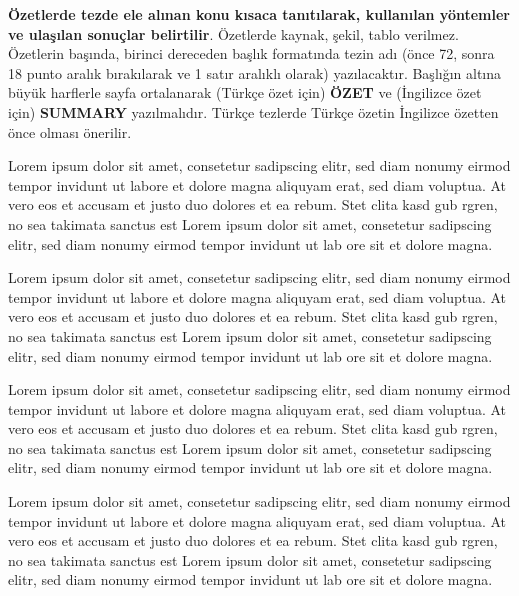 \begin{ozet}
\textbf{Özetlerde tezde ele alınan konu kısaca tanıtılarak, kullanılan yöntemler ve ulaşılan sonuçlar belirtilir}. Özetlerde kaynak, şekil, tablo verilmez. Özetlerin başında, birinci dereceden başlık formatında tezin adı (önce 72, sonra 18 punto aralık bırakılarak ve 1 satır aralıklı olarak) yazılacaktır.  Başlığın altına büyük harflerle sayfa ortalanarak (Türkçe özet için) \textbf{ÖZET} ve (İngilizce özet için) \textbf{SUMMARY} yazılmalıdır. Türkçe tezlerde Türkçe özetin İngilizce özetten önce olması önerilir.

Lorem ipsum dolor sit amet, consetetur sadipscing elitr, sed diam nonumy eirmod tempor invidunt ut labore et dolore magna aliquyam erat, sed diam voluptua. At vero eos et accusam et justo duo dolores et ea rebum. Stet clita kasd gub rgren, no sea takimata sanctus est Lorem ipsum dolor sit amet, consetetur sadipscing elitr, sed diam nonumy eirmod tempor invidunt ut lab ore sit et dolore magna.

Lorem ipsum dolor sit amet, consetetur sadipscing elitr, sed diam nonumy eirmod tempor invidunt ut labore et dolore magna aliquyam erat, sed diam voluptua. At vero eos et accusam et justo duo dolores et ea rebum. Stet clita kasd gub rgren, no sea takimata sanctus est Lorem ipsum dolor sit amet, consetetur sadipscing elitr, sed diam nonumy eirmod tempor invidunt ut lab ore sit et dolore magna.

Lorem ipsum dolor sit amet, consetetur sadipscing elitr, sed diam nonumy eirmod tempor invidunt ut labore et dolore magna aliquyam erat, sed diam voluptua. At vero eos et accusam et justo duo dolores et ea rebum. Stet clita kasd gub rgren, no sea takimata sanctus est Lorem ipsum dolor sit amet, consetetur sadipscing elitr, sed diam nonumy eirmod tempor invidunt ut lab ore sit et dolore magna.

Lorem ipsum dolor sit amet, consetetur sadipscing elitr, sed diam nonumy eirmod tempor invidunt ut labore et dolore magna aliquyam erat, sed diam voluptua. At vero eos et accusam et justo duo dolores et ea rebum. Stet clita kasd gub rgren, no sea takimata sanctus est Lorem ipsum dolor sit amet, consetetur sadipscing elitr, sed diam nonumy eirmod tempor invidunt ut lab ore sit et dolore magna.


\end{ozet}

